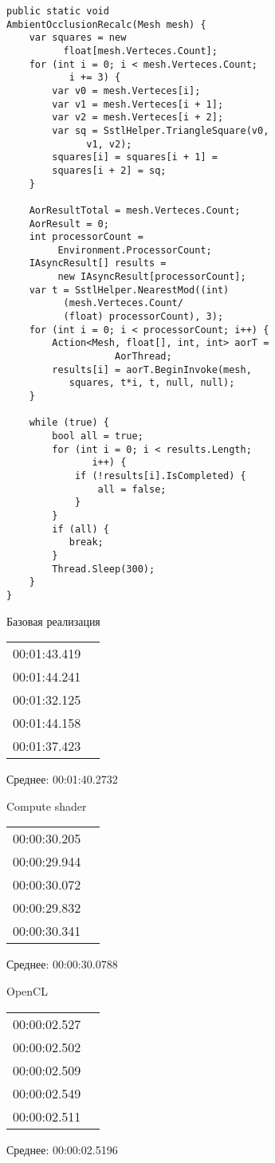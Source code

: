 \clearpage
{}
\begin{lstlisting}
public static void 
AmbientOcclusionRecalc(Mesh mesh) {
    var squares = new 
          float[mesh.Verteces.Count];
    for (int i = 0; i < mesh.Verteces.Count; 
           i += 3) {
        var v0 = mesh.Verteces[i];
        var v1 = mesh.Verteces[i + 1];
        var v2 = mesh.Verteces[i + 2];
        var sq = SstlHelper.TriangleSquare(v0, 
              v1, v2);
        squares[i] = squares[i + 1] = 
        squares[i + 2] = sq;
    }

    AorResultTotal = mesh.Verteces.Count;
    AorResult = 0;
    int processorCount = 
         Environment.ProcessorCount;
    IAsyncResult[] results = 
         new IAsyncResult[processorCount];
    var t = SstlHelper.NearestMod((int) 
          (mesh.Verteces.Count/
          (float) processorCount), 3);
    for (int i = 0; i < processorCount; i++) {
        Action<Mesh, float[], int, int> aorT = 
                   AorThread;
        results[i] = aorT.BeginInvoke(mesh, 
           squares, t*i, t, null, null);
    }

    while (true) {
        bool all = true;
        for (int i = 0; i < results.Length; 
               i++) {
            if (!results[i].IsCompleted) {
                all = false;
            }
        }
        if (all) {
           break;
        }
        Thread.Sleep(300);
    }
}
\end{lstlisting}

\clearpage
{}
Базовая реализация\newline
\begin{table}[h]
\begin{tabular}{|cc|}
00:01:43.419 & \\
00:01:44.241  & \\
00:01:32.125  & \\
00:01:44.158  & \\
00:01:37.423  & \\
\end{tabular}
\end{table}
Среднее: 00:01:40.2732

Compute shader\newline
\begin{table}[h]
\begin{tabular}{|cc|}
00:00:30.205 & \\
00:00:29.944  & \\
00:00:30.072  & \\
00:00:29.832  & \\
00:00:30.341  & \\
\end{tabular}
\end{table}
Среднее: 00:00:30.0788


OpenCL\newline
\begin{table}[h]
\begin{tabular}{|cc|}
00:00:02.527 & \\
00:00:02.502  & \\
00:00:02.509  & \\
00:00:02.549  & \\
00:00:02.511  & \\
\end{tabular}
\end{table}
Среднее: 00:00:02.5196
